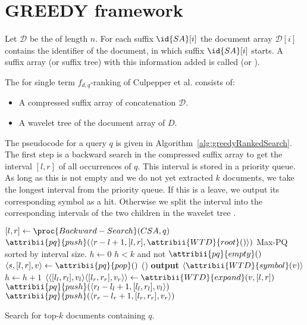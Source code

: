 \section{GREEDY framework}

\begin{Definition}
  Let $\mathcal{D}$ be the  of length $n$. For each suffix $\id{SA}[i]$ the document array $\mathcal{D}[i]$ contains the identifier of the document, in which suffix $\id{SA}[i]$ starts. A suffix array (or suffix tree) with this information added is called  (or ).
\end{Definition}

\begin{Definition}
  The  for single term $f_{d,q}$-ranking of Culpepper et al. \cite{Culpepper2010} consists of:
  \begin{itemize}
    \item A compressed suffix array  of concatenation $\mathcal{D}$.
    \item A wavelet tree  of the document array of $D$.
  \end{itemize}
  The pseudocode  for a query $q$ is given in Algorithm~\ref{alg:greedyRankedSearch}. The first step is a backward search in the compressed suffix array  to get the interval $[l,r]$ of all occurrences of $q$. This interval is stored in a priority queue. As long as this is not empty and we do not yet extracted $k$ documents, we take the longest interval from the priority queue. If this is a leave, we output its corresponding symbol as a hit. Otherwise we split the interval into the corresponding intervals of the two children in the wavelet tree .
\end{Definition}

\begin{algorithm}[htb]
  \begin{codebox}
    \li $[l,r] \gets \proc{Backward-Search}(CSA, q)$
    \li $\attribii{pq}{push}(\langle r - l + 1, [l,r], \attribii{WTD}{root}()\rangle)$ \>\>\>\>\>\>\>\>\Comment Max-PQ sorted by interval size.
    \li $h \gets 0$
    \li \While $h < k$ and not $\attribii{pq}{empty}()$
        \Do
    \li   $\langle s, [l,r], v \rangle \gets \attribii{pq}{pop}()$
    \li   \If {}()
          \Then
    \li     \textbf{output} $\langle \attribii{WTD}{symbol}(v) \rangle$
    \li     $h \gets h + 1$
    \li   \Else
    \li     $\langle \langle [l_l, r_l], v_l \rangle \langle [l_r, r_r], v_r \rangle \rangle \gets \attribii{WTD}{expand}(v, [l,r])$
    \li     $\attribii{pq}{push}(\langle r_l - l_l + 1, [l_l, r_l], v_l \rangle)$
    \li     $\attribii{pq}{push}(\langle r_r - l_r + 1, [l_r, r_r], v_r \rangle)$
          \End
        \End
  \end{codebox}
  \caption{Search for top-$k$ documents containing $q$.}
  \label{alg:greedyRankedSearch}
\end{algorithm}

